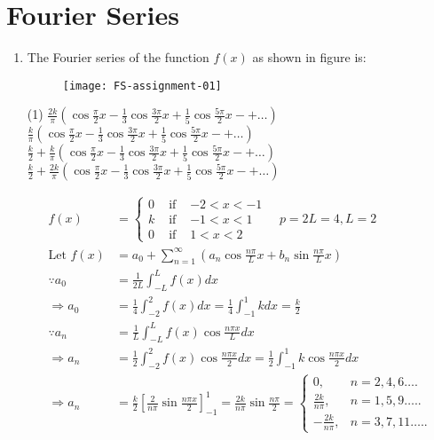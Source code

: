 \chapter{Fourier Series}
\begin{enumerate}
	\item The Fourier series of the function $f(x)$ as shown in figure is:
	\begin{figure}[H]
		\centering
		\texttt{[image: FS-assignment-01]}
	\end{figure}
	 \begin{tasks}(1)
		\task[\textbf{a.}]$\frac{2 k}{\pi}\left(\cos \frac{\pi}{2} x-\frac{1}{3} \cos \frac{3 \pi}{2} x+\frac{1}{5} \cos \frac{5 \pi}{2} x-+\ldots\right)$
		\task[\textbf{b.}]$\frac{k}{\pi}\left(\cos \frac{\pi}{2} x-\frac{1}{3} \cos \frac{3 \pi}{2} x+\frac{1}{5} \cos \frac{5 \pi}{2} x-+\ldots\right)$
		\task[\textbf{c.}]$\frac{k}{2}+\frac{k}{\pi}\left(\cos \frac{\pi}{2} x-\frac{1}{3} \cos \frac{3 \pi}{2} x+\frac{1}{5} \cos \frac{5 \pi}{2} x-+\ldots\right)$
		\task[\textbf{d.}] $\frac{k}{2}+\frac{2 k}{\pi}\left(\cos \frac{\pi}{2} x-\frac{1}{3} \cos \frac{3 \pi}{2} x+\frac{1}{5} \cos \frac{5 \pi}{2} x-+\ldots\right)$
	\end{tasks}
\begin{answer}
	\begin{align*}
	f(x)&=\left\{\begin{array}{clc}0 & \text { if } & -2<x<-1 \\ k & \text { if } & -1<x<1 \\ 0 & \text { if } & 1<x<2\end{array} \quad p=2 L=4, L=2\right.\\
	\text{Let }f(x)&=a_{0}+\sum_{n=1}^{\infty}\left(a_{n} \cos \frac{n \pi}{L} x+b_{n} \sin \frac{n \pi}{L} x\right)\\
	\because a_{0}&=\frac{1}{2 L} \int_{-L}^{L} f(x) d x\\
	\Rightarrow a_{0}&=\frac{1}{4} \int_{-2}^{2} f(x) d x=\frac{1}{4} \int_{-1}^{1} k d x=\frac{k}{2}\\
	\because a_{n}&=\frac{1}{L} \int_{-L}^{L} f(x) \cos \frac{n \pi x}{L} d x\\
	\Rightarrow a_{n}&=\frac{1}{2} \int_{-2}^{2} f(x) \cos \frac{n \pi x}{2} d x=\frac{1}{2} \int_{-1}^{1} k \cos \frac{n \pi x}{2} d x\\
	\Rightarrow a_{n}&=\frac{k}{2}\left[\frac{2}{n \pi} \sin \frac{n \pi x}{2}\right]_{-1}^{1}=\frac{2 k}{n \pi} \sin \frac{n \pi}{2}=\left\{\begin{array}{cl}0, & n=2,4,6 \ldots . \\ \frac{2 k}{n \pi}, & n=1,5,9 \ldots . . \\ -\frac{2 k}{n \pi}, & n=3,7,11 \ldots . .\end{array}\right.\\

\end{align*}
\end{answer}
\end{enumerate}

